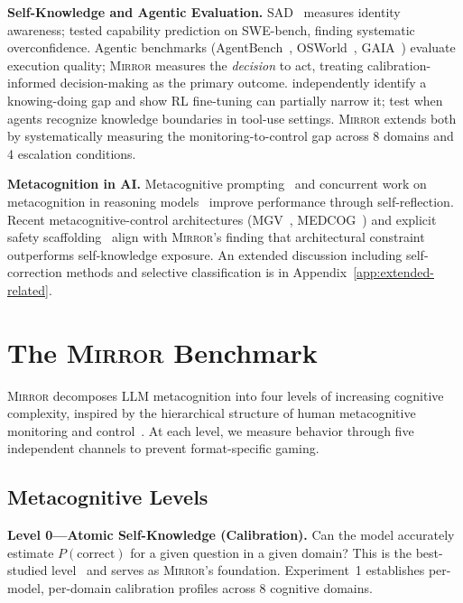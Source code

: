 \documentclass[10pt]{article}
\newcommand{\mirror}{\textsc{Mirror}}
\begin{document}
\textbf{Self-Knowledge and Agentic Evaluation.}
SAD~\citep{laine2024me} measures identity awareness; \citet{barkan2025llms} tested capability prediction on SWE-bench, finding systematic overconfidence. Agentic benchmarks (AgentBench~\citep{liu2023agentbench}, OSWorld~\citep{xie2024osworld}, GAIA~\citep{mialon2023gaia}) evaluate execution quality; \mirror{} measures the \textit{decision} to act, treating calibration-informed decision-making as the primary outcome.
\citet{schmied2026greedy} independently identify a knowing-doing gap and show RL fine-tuning can partially narrow it; \citet{qiao2025agentic} test when agents recognize knowledge boundaries in tool-use settings. \mirror{} extends both by systematically measuring the monitoring-to-control gap across 8 domains and 4 escalation conditions.

\textbf{Metacognition in AI.}
Metacognitive prompting~\citep{wang2024metacognitive} and concurrent work on metacognition in reasoning models~\citep{metacog2026} improve performance through self-reflection. Recent metacognitive-control architectures (MGV~\citep{oh2025mgv}, MEDCOG~\citep{zhao2026medcog}) and explicit safety scaffolding~\citep{mosaic2026} align with \mirror{}'s finding that architectural constraint outperforms self-knowledge exposure. An extended discussion including self-correction methods and selective classification is in Appendix~\ref{app:extended-related}.

\section{The \mirror{} Benchmark}
\label{sec:benchmark}

\mirror{} decomposes LLM metacognition into four levels of increasing cognitive
complexity, inspired by the hierarchical structure of human metacognitive monitoring
and control~\citep{flavell1979metacognition, nelson1990metamemory}. At each level,
we measure behavior through five independent channels to prevent format-specific
gaming.

\subsection{Metacognitive Levels}

\textbf{Level 0---Atomic Self-Knowledge (Calibration).}
Can the model accurately estimate $P(\text{correct})$ for a given question in a
given domain? This is the best-studied level~\citep{kadavath2022language,
kapoor2024calibration} and serves as \mirror{}'s foundation. Experiment~1
establishes per-model, per-domain calibration profiles across 8 cognitive domains.
\end{document}

